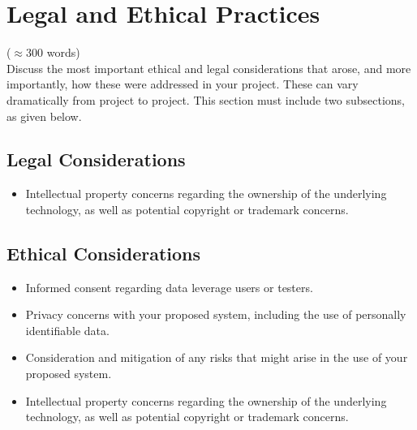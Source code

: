 \documentclass[12pt]{article}
\begin{document}
\section{Legal and Ethical Practices}\label{chap:ethics}
($\approx$300 words)\\
Discuss the most important ethical and legal considerations that arose, and more importantly, how these were addressed in your project. These can vary dramatically from project to project. This section must include two subsections, as given below.
\subsection{Legal Considerations}\label{sec:legal}
\begin{itemize}
\item Intellectual property concerns regarding the ownership of the underlying technology, as well as potential copyright or trademark concerns.
\end{itemize}

\subsection{Ethical Considerations}\label{sec:ethical}
\begin{itemize}
\item Informed consent regarding data leverage users or testers.
\item Privacy concerns with your proposed system, including the use of personally identifiable
data.
\item Consideration and mitigation of any risks that might arise in the use of your proposed
system.
\item Intellectual property concerns regarding the ownership of the underlying technology,
as well as potential copyright or trademark concerns.
\end{itemize}
\end{document}
